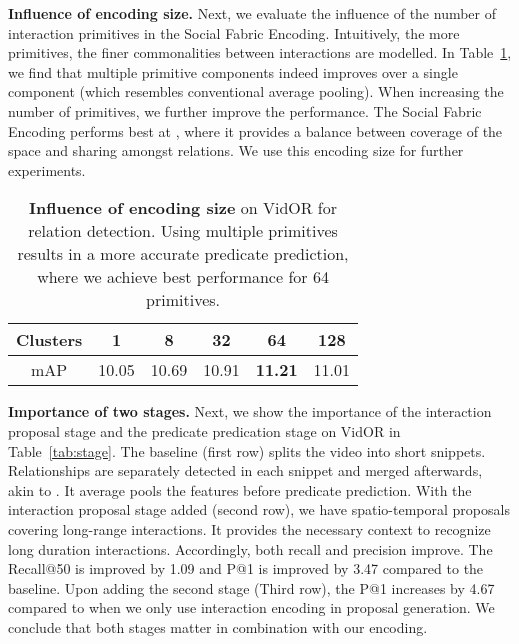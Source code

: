 \documentclass[10pt,twocolumn,letterpaper]{article}
\begin{document}
\textbf{Influence of encoding size.} 
Next, we evaluate the influence of the number of interaction primitives in the Social Fabric Encoding. Intuitively, the more primitives, the finer commonalities between interactions are modelled. In Table~\ref{tab:iter}, we find that multiple primitive components indeed improves over a single component (which resembles conventional average pooling).
When increasing the number of primitives, we further improve the performance. The Social Fabric Encoding performs best at , where it provides a balance between coverage of the space and sharing amongst relations. We use this encoding size for further experiments.

\begin{table}[t]
\centering
\begin{tabular}{cccccc}
\toprule
 Clusters  & 1 & 8 & 32 & 64 & 128 \\
\midrule
mAP & 10.05 & 10.69 & 10.91 & \textbf{11.21} & 11.01 \\
\bottomrule
\end{tabular}
\caption{\textbf{Influence of encoding size} on VidOR for relation detection. Using multiple primitives results in a more accurate predicate prediction, where we achieve best performance for 64 primitives.}
\label{tab:iter}
\end{table}


\textbf{Importance of two stages.}
Next, we show the importance of the interaction proposal stage and the predicate predication stage on VidOR in Table~\ref{tab:stage}. 
The baseline (first row) splits the video into short snippets. Relationships are separately detected in each snippet and merged afterwards, akin to \cite{qian2019video, xie2020video, su2020video}. It average pools the features before predicate prediction. With the interaction proposal stage added (second row), we have spatio-temporal proposals covering long-range interactions. It provides the necessary context to recognize long duration interactions. Accordingly, both recall and precision improve. The Recall@50 is improved by 1.09 and P@1 is improved by 3.47 compared to the baseline. Upon adding the second stage (Third row), the P@1 increases by 4.67 compared to when we only use interaction encoding in proposal generation. We conclude that both stages matter in combination with our encoding.
\end{document}
